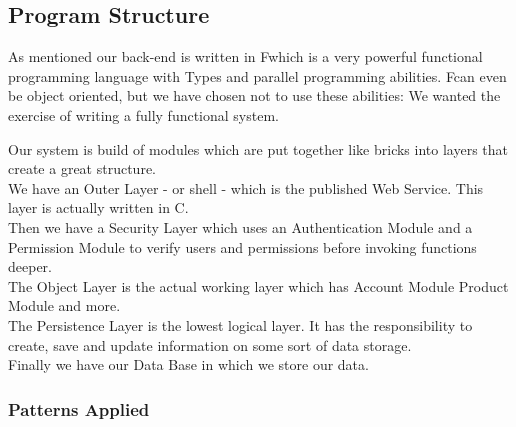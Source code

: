 \subsection{Program Structure}
As mentioned our back-end is written in F\Sh which is a very powerful functional programming language with Types and parallel programming abilities. F\Sh can even be object oriented, but we have chosen not to use these abilities: We wanted the exercise of writing a fully functional system.

Our system is build of modules which are put together like bricks into layers that create a great structure.
\\We have an Outer Layer - or shell - which is the published Web Service. This layer is actually written in C\Sh.
\\Then we have a Security Layer which uses an Authentication Module and a Permission Module to verify users and permissions before invoking functions deeper.
\\The Object Layer is the actual working layer which has Account Module Product Module and more.
\\The Persistence Layer is the lowest logical layer. It has the responsibility to create, save and update information on some sort of data storage.
\\Finally we have our Data Base in which we store our data.

\subsubsection{Patterns Applied}
\newpage